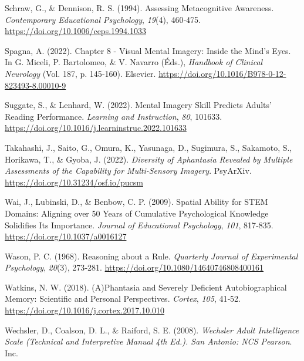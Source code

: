 \documentclass[
  12pt,
]{article}
\newlength{\cslhangindent}
\newlength{\cslentryspacingunit} %
\newenvironment{CSLReferences}[2] %
 {%
  \setlength{\parindent}{0pt}
  \ifodd #1
  \let\oldpar\par
  \def\par{\hangindent=\cslhangindent\oldpar}
  \fi
  \setlength{\parskip}{#2\cslentryspacingunit}
 }%
 {}
\begin{document}
\begin{CSLReferences}{1}{0}
\leavevmode{}%
Schraw, G., \& Dennison, R. S. (1994). Assessing {Metacognitive
Awareness}. \emph{Contemporary Educational Psychology}, \emph{19}(4),
460‑475. \url{https://doi.org/10.1006/ceps.1994.1033}

\leavevmode{}%
Spagna, A. (2022). Chapter 8 - {Visual} Mental Imagery: {Inside} the
Mind's Eyes. In G. Miceli, P. Bartolomeo, \& V. Navarro (Éds.),
\emph{Handbook of {Clinical Neurology}} (Vol. 187, p. 145‑160).
{Elsevier}. \url{https://doi.org/10.1016/B978-0-12-823493-8.00010-9}

\leavevmode{}%
Suggate, S., \& Lenhard, W. (2022). Mental Imagery Skill Predicts
Adults' Reading Performance. \emph{Learning and Instruction}, \emph{80},
101633. \url{https://doi.org/10.1016/j.learninstruc.2022.101633}

\leavevmode{}%
Takahashi, J., Saito, G., Omura, K., Yasunaga, D., Sugimura, S.,
Sakamoto, S., Horikawa, T., \& Gyoba, J. (2022). \emph{Diversity of
Aphantasia Revealed by Multiple Assessments of the Capability for
Multi-Sensory Imagery}. {PsyArXiv}.
\url{https://doi.org/10.31234/osf.io/pucsm}

\leavevmode{}%
Wai, J., Lubinski, D., \& Benbow, C. P. (2009). Spatial Ability for
{STEM} Domains: {Aligning} over 50 Years of Cumulative Psychological
Knowledge Solidifies Its Importance. \emph{Journal of Educational
Psychology}, \emph{101}, 817‑835. \url{https://doi.org/10.1037/a0016127}

\leavevmode{}%
Wason, P. C. (1968). Reasoning about a {Rule}. \emph{Quarterly Journal
of Experimental Psychology}, \emph{20}(3), 273‑281.
\url{https://doi.org/10.1080/14640746808400161}

\leavevmode{}%
Watkins, N. W. (2018). ({A})Phantasia and Severely Deficient
Autobiographical Memory: {Scientific} and Personal Perspectives.
\emph{Cortex}, \emph{105}, 41‑52.
\url{https://doi.org/10.1016/j.cortex.2017.10.010}

\leavevmode{}%
Wechsler, D., Coalson, D. L., \& Raiford, S. E. (2008). \emph{Wechsler
Adult Intelligence Scale ({Technical} and Interpretive Manual 4th Ed.).
{San Antonio}: {NCS Pearson}}. {Inc}.


\end{CSLReferences}
\end{document}
